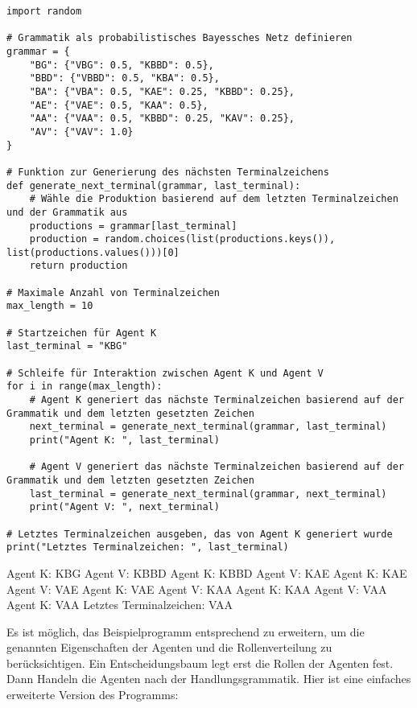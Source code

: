 \documentclass[12pt]{article}
\begin{document}
\begin{verbatim}
import random

# Grammatik als probabilistisches Bayessches Netz definieren
grammar = {
    "BG": {"VBG": 0.5, "KBBD": 0.5},
    "BBD": {"VBBD": 0.5, "KBA": 0.5},
    "BA": {"VBA": 0.5, "KAE": 0.25, "KBBD": 0.25},
    "AE": {"VAE": 0.5, "KAA": 0.5},
    "AA": {"VAA": 0.5, "KBBD": 0.25, "KAV": 0.25},
    "AV": {"VAV": 1.0}
}

# Funktion zur Generierung des nächsten Terminalzeichens
def generate_next_terminal(grammar, last_terminal):
    # Wähle die Produktion basierend auf dem letzten Terminalzeichen und der Grammatik aus
    productions = grammar[last_terminal]
    production = random.choices(list(productions.keys()), list(productions.values()))[0]
    return production

# Maximale Anzahl von Terminalzeichen
max_length = 10

# Startzeichen für Agent K
last_terminal = "KBG"

# Schleife für Interaktion zwischen Agent K und Agent V
for i in range(max_length):
    # Agent K generiert das nächste Terminalzeichen basierend auf der Grammatik und dem letzten gesetzten Zeichen
    next_terminal = generate_next_terminal(grammar, last_terminal)
    print("Agent K: ", last_terminal)

    # Agent V generiert das nächste Terminalzeichen basierend auf der Grammatik und dem letzten gesetzten Zeichen
    last_terminal = generate_next_terminal(grammar, next_terminal)
    print("Agent V: ", next_terminal)

# Letztes Terminalzeichen ausgeben, das von Agent K generiert wurde
print("Letztes Terminalzeichen: ", last_terminal)

\end{verbatim}

Agent K:  KBG
Agent V:  KBBD
Agent K:  KBBD
Agent V:  KAE
Agent K:  KAE
Agent V:  VAE
Agent K:  VAE
Agent V:  KAA
Agent K:  KAA
Agent V:  VAA
Agent K:  VAA
Letztes Terminalzeichen:  VAA


Es ist möglich, das Beispielprogramm entsprechend zu erweitern, um die genannten Eigenschaften der Agenten und die Rollenverteilung zu berücksichtigen. Ein Entscheidungsbaum legt erst die Rollen der Agenten fest. Dann Handeln die Agenten nach der Handlungsgrammatik. Hier ist eine einfaches erweiterte Version des Programms:
\end{document}

